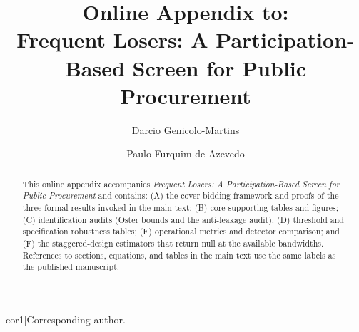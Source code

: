 \documentclass[12pt,authoryear]{elsarticle}
\def\corref#1{}%
\def\cortext#1{}%
\def\ead#1{}%
\begin{document}
\sloppy
\hfuzz=300pt

\begin{frontmatter}

\title{Online Appendix to:\\
Frequent Losers: A Participation-Based Screen for Public Procurement}

\author[insper]{Darcio Genicolo-Martins\corref{cor1}}
\ead{darciogm1@insper.edu.br}
\author[insper]{Paulo Furquim de Azevedo}
\cortext[cor1]{Corresponding author.}

\begin{abstract}
\noindent This online appendix accompanies \emph{Frequent Losers:
A Participation-Based Screen for Public Procurement} and
contains: (A) the cover-bidding framework and proofs of the three
formal results invoked in the main text; (B) core supporting tables
and figures; (C) identification audits (Oster bounds and the
anti-leakage audit); (D) threshold and specification robustness
tables; (E) operational metrics and detector comparison; and
(F) the staggered-design estimators that return null at the
available bandwidths. References to sections, equations, and
tables in the main text use the same labels as the published
manuscript.
\end{abstract}

\end{frontmatter}

\appendix

\setcounter{table}{0}
\setcounter{figure}{0}
\renewcommand{\thetable}{\Alph{section}.\arabic{table}}
\renewcommand{\thefigure}{\Alph{section}.\arabic{figure}}
\makeatletter
{}
\makeatother





\end{document}
